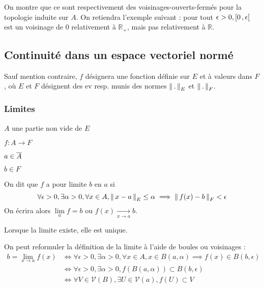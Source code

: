    On montre que ce sont respectivement des voisinages-ouverts-fermés pour la topologie induite sur $A$. On retiendra l’exemple suivant : pour tout $\epsilon > 0, \left[ 0 \, , \epsilon \right[$ est un voisinage de $0$ relativement à $\mathbb{R}_+$, mais pas relativement à $\mathbb{R}$.

\subsection{Continuité dans un espace vectoriel normé}

    Sauf mention contraire, $f$ désignera une fonction définie sur $E$ et à valeurs dans $F$, où $E$ et $F$ désignent des ev resp. munis des normes $\left\lVert \,. \, \right\rVert_E$ et $\left\lVert \,. \, \right\rVert_F$.

    \subsubsection{Limites}

    \begin{defi}{}{}
        \begin{soient}
            \item $A$ une partie non vide de $E$ 
            \item $f : A \rightarrow F$
            \item $a \in \overline{A}$
            \item $b \in F$
        \end{soient}
        On dit que $f$ a pour limite $b$ en $a$ si 
        \[ \forall \epsilon > 0, \exists \alpha > 0, \forall x \in A, \left\lVert \,x-a \, \right\rVert_E \leq \alpha \implies \left\lVert \,f(x)-b \, \right\rVert_F < \epsilon \] 
        On écrira alors $\lim\limits_{a} f = b$ ou $f(x) \underset{x \rightarrow a}{\longrightarrow} b$.
    \end{defi}

    Lorsque la limite existe, elle est unique.

    On peut reformuler la définition de la limite à l’aide de boules ou voisinages : 
    \begin{align*}
        b = \lim\limits_{x \rightarrow a}  f(x) & \iff \forall \epsilon > 0, \exists \alpha > 0, \forall x \in A, x \in B(a,\alpha) \implies f(x) \in B(b,\epsilon) \\
        & \iff \forall \epsilon > 0, \exists \alpha > 0, f\left(B(a,\alpha)\right) \subset B(b,\epsilon) \\
        & \iff \forall V \in \mathcal{V}(B), \exists U \in \mathcal{V}(a), f(U) \subset V
    \end{align*}

